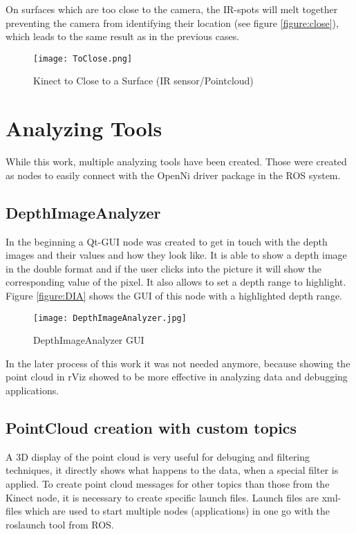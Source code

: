 On surfaces which are too close to the camera, the IR-spots will melt together preventing the camera from
identifying their location (see figure \vref{figure:close}), which leads to the same result as in the previous cases.
\begin{figure}[htp]
\begin{center}
  \texttt{[image: ToClose.png]} 
  \caption{Kinect to Close to a Surface (IR sensor/Pointcloud)}
  \label{figure:close}
\end{center}
\end{figure}
\clearpage 
 
\section{Analyzing Tools} 
While this work, multiple analyzing tools have been created. Those were created as
nodes to easily connect with the OpenNi driver package in the ROS system.
\subsection{DepthImageAnalyzer}
In the beginning a Qt-GUI node was created to get in touch with the depth images and 
their values and how they look like. It is able to show a depth image in the double
format and if the user clicks into the picture it will show the corresponding 
value of the pixel. It also allows to set a depth range to highlight. 
Figure \vref{figure:DIA} shows the GUI of this node with a highlighted depth range.

\begin{figure}[h!tp]
\begin{center}
  \texttt{[image: DepthImageAnalyzer.jpg]}
  \caption{DepthImageAnalyzer GUI}
  \label{figure:DIA}
\end{center}
\end{figure}
\clearpage 


In the later process of this work it was not needed anymore, because showing the point cloud
in rViz showed to be more effective in analyzing data and debugging applications.

\subsection{PointCloud creation with custom topics}
A 3D display of the point cloud is very useful for debuging and filtering techniques, it directly shows what 
happens to the data, when a special filter is applied.
To create point cloud messages for other topics than those from the Kinect node, it is necessary to
create specific launch files. Launch files are xml-files which are used to start multiple nodes (applications) 
in one go with the roslaunch tool from ROS. 


